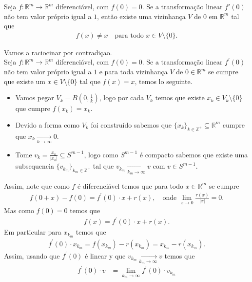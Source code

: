 \begin{homeworkProblem}[Seção 1-9]
  Seja $f : \mathbb{R}^m \to \mathbb{R}^m$ diferenciável, com $f(0)=0$. Se a transformação linear $f'(0)$ não tem valor próprio igual a $1$, então existe uma vizinhança $V$ de $0$ em $\mathbb{R}^m$ tal que
  \begin{align*}
    f(x) \neq x \quad \text{para todo } x \in V \setminus \{0\}.   
  \end{align*}
  \begin{solution}
    Vamos a raciocinar por contradiçao.\\
    Seja $f:\mathbb{R}^{m}\to\mathbb{R}^{m}$ diferenciável, com $f(0)=0$. Se a transformação linear $f^{\prime}(0)$ não tem valor próprio igual a $1$ e para toda vizinhança $V$ de $0\in\mathbb{R}^{m}$ se cumpre que existe um $x\in V\setminus\{0\}$ tal que $f(x)=x$, temos lo seguinte.
    \begin{itemize}
      \item Vamos pegar $V_k=B\left(0,\frac{1}{k}\right)$, logo por cada $V_k$ temos que existe $x_k\in V_k\setminus\{0\}$ que cumpre $f(x_k)=x_k$.
      \item Devido a forma como $V_k$ foi construído sabemos que $\{x_k\}_{k\in\mathbb{Z}^{+}}\subseteq \mathbb{R}^{m}$ cumpre que $x_k\xrightarrow[k\to\infty]{}0$.
      \item Tome $\displaystyle v_k=\frac{x_k}{|x_k|}\subseteq S^{m-1}$, logo como $S^{m-1}$ é compacto sabemos que existe uma subsequencia $\{v_{k_m}\}_{k_m\in\mathbb{Z}^{+}}$ tal que $v_{k_m}\xrightarrow[k_m\to\infty]{}v$ com $v\in S^{m-1}$. 
    \end{itemize}
    Assim, note que como $f$ é diferenciável temos que para todo $x\in\mathbb{R}^{m}$ se cumpre 
    \begin{align*}
      f(0+x)-f(0)=f^{\prime}(0)\cdot x+r(x),\quad\text{onde }\lim_{x \to 0}\frac{r(x)}{|x|}=0.
    \end{align*}
    Mas como $f(0)=0$ temos que
    \begin{align*}
      f(x)=f^{\prime}(0)\cdot x+r(x).
    \end{align*}
    Em particular para $x_{k_m}$ temos que
    \begin{align*}
      f^{\prime}(0)\cdot x_{k_m}=f(x_{k_m})-r(x_{k_m})=x_{k_m}-r(x_{k_m}).
    \end{align*}
    Assim, usando que $f^{\prime}(0)$ é linear y que $v_{k_m}\xrightarrow[k_m\to\infty]{}v$ temos que
    \begin{align*}
      f^{\prime}(0)\cdot v&=\lim_{k_m \to \infty}f^{\prime}(0)\cdot v_{k_m}\\

\end{align*}
\end{solution}
\end{homeworkProblem}

